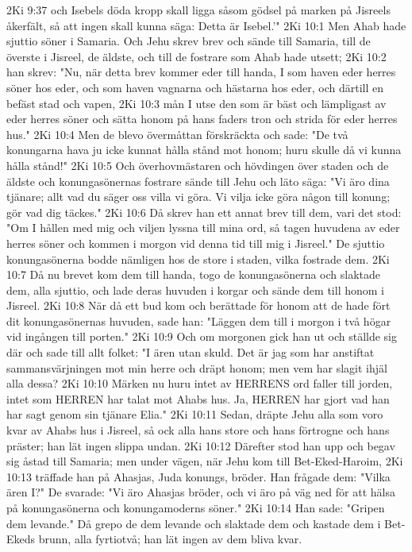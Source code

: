 2Ki 9:37  och Isebels döda kropp skall ligga såsom gödsel på marken på Jisreels åkerfält, så att ingen skall kunna säga: Detta är Isebel.'"
2Ki 10:1  Men Ahab hade sjuttio söner i Samaria. Och Jehu skrev brev och sände till Samaria, till de överste i Jisreel, de äldste, och till de fostrare som Ahab hade utsett;
2Ki 10:2  han skrev: "Nu, när detta brev kommer eder till handa, I som haven eder herres söner hos eder, och som haven vagnarna och hästarna hos eder, och därtill en befäst stad och vapen,
2Ki 10:3  mån I utse den som är bäst och lämpligast av eder herres söner och sätta honom på hans faders tron och strida för eder herres hus."
2Ki 10:4  Men de blevo övermåttan förskräckta och sade: "De två konungarna hava ju icke kunnat hålla stånd mot honom; huru skulle då vi kunna hålla stånd!"
2Ki 10:5  Och överhovmästaren och hövdingen över staden och de äldste och konungasönernas fostrare sände till Jehu och läto säga: "Vi äro dina tjänare; allt vad du säger oss villa vi göra. Vi vilja icke göra någon till konung; gör vad dig täckes."
2Ki 10:6  Då skrev han ett annat brev till dem, vari det stod: "Om I hållen med mig och viljen lyssna till mina ord, så tagen huvudena av eder herres söner och kommen i morgon vid denna tid till mig i Jisreel." De sjuttio konungasönerna bodde nämligen hos de store i staden, vilka fostrade dem.
2Ki 10:7  Då nu brevet kom dem till handa, togo de konungasönerna och slaktade dem, alla sjuttio, och lade deras huvuden i korgar och sände dem till honom i Jisreel.
2Ki 10:8  När då ett bud kom och berättade för honom att de hade fört dit konungasönernas huvuden, sade han: "Läggen dem till i morgon i två högar vid ingången till porten."
2Ki 10:9  Och om morgonen gick han ut och ställde sig där och sade till allt folket: "I ären utan skuld. Det är jag som har anstiftat sammansvärjningen mot min herre och dräpt honom; men vem har slagit ihjäl alla dessa?
2Ki 10:10  Märken nu huru intet av HERRENS ord faller till jorden, intet som HERREN har talat mot Ahabs hus. Ja, HERREN har gjort vad han har sagt genom sin tjänare Elia."
2Ki 10:11  Sedan, dräpte Jehu alla som voro kvar av Ahabs hus i Jisreel, så ock alla hans store och hans förtrogne och hans präster; han lät ingen slippa undan.
2Ki 10:12  Därefter stod han upp och begav sig åstad till Samaria; men under vägen, när Jehu kom till Bet-Eked-Haroim,
2Ki 10:13  träffade han på Ahasjas, Juda konungs, bröder. Han frågade dem: "Vilka ären I?" De svarade: "Vi äro Ahasjas bröder, och vi äro på väg ned för att hälsa på konungasönerna och konungamoderns söner."
2Ki 10:14  Han sade: "Gripen dem levande." Då grepo de dem levande och slaktade dem och kastade dem i Bet-Ekeds brunn, alla fyrtiotvå; han lät ingen av dem bliva kvar.
